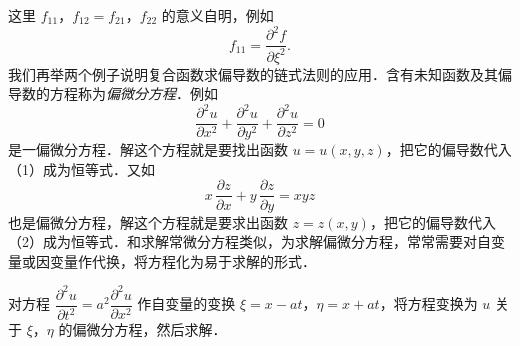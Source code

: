 这里 $f_{11}$，$f_{12}=f_{21}$，$f_{22}$ 的意义自明，例如
\[
f_{11}=\frac{\partial^{2}f}{\partial\xi^{2}}.
\]
我们再举两个例子说明复合函数求偏导数的链式法则的应用．含有未知函数及其偏导数的方程称为\emph{偏微分方程}．例如
\begin{equation}
\frac{\partial^{2}u}{\partial x^{2}}+\frac{\partial^{2}u}{\partial y^{2}}+\frac{\partial^{2}u}{\partial z^{2}}=0
\tag{1}
\end{equation}
是一偏微分方程．解这个方程就是要找出函数 $u=u(x,y,z)$，把它的偏导数代入（1）成为恒等式．又如
\begin{equation}
x\,\frac{\partial z}{\partial x}+y\,\frac{\partial z}{\partial y}=xyz
\tag{2}
\end{equation}
也是偏微分方程，解这个方程就是要求出函数 $z=z(x,y)$，把它的偏导数代入（2）成为恒等式．和求解常微分方程类似，为求解偏微分方程，常常需要对自变量或因变量作代换，将方程化为易于求解的形式．

\begin{example}\label{ex:16-2-5}
对方程 $\dfrac{\partial^{2}u}{\partial t^{2}}=a^{2}\dfrac{\partial^{2}u}{\partial x^{2}}$ 作自变量的变换 $\xi=x-at$，$\eta=x+at$，将方程变换为 $u$ 关于 $\xi$，$\eta$ 的偏微分方程，然后求解．
\end{example}

